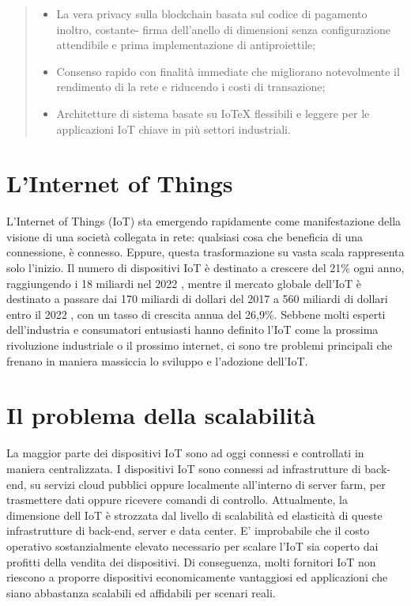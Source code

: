 \documentclass[a4paper,12pt]{article}
\begin{document}
\begin{abstract}
\begin{itemize}
		\item{La vera privacy sulla blockchain basata sul codice di pagamento inoltro, costante- firma dell'anello di dimensioni senza configurazione attendibile e prima implementazione di antiproiettile;}

		\item{Consenso rapido con finalità immediate che migliorano notevolmente il rendimento di la rete e riducendo i costi di transazione;}

		\item{Architetture di sistema basate su IoTeX flessibili e leggere per le applicazioni IoT chiave in più settori industriali.}

	\end{itemize}

\end{abstract}

\pagebreak

\tableofcontents


\section{L'Internet of Things}
L'Internet of Things (IoT) sta emergendo rapidamente come manifestazione della visione di una società collegata in rete: qualsiasi cosa che beneficia di una connessione, è connesso. Eppure, questa trasformazione su vasta scala rappresenta solo l'inizio. Il numero di dispositivi IoT è destinato a crescere del 21\% ogni anno, raggiungendo i 18 miliardi nel 2022 \cite{r10}, mentre il mercato globale dell'IoT è destinato a passare dai 170 miliardi di dollari del 2017 a 560 miliardi di dollari entro il 2022 \cite{r15}, con un tasso di crescita annua del 26,9\%. Sebbene molti esperti dell'industria e consumatori entusiasti hanno definito l'IoT come la prossima rivoluzione industriale o il prossimo internet, ci sono tre problemi principali che frenano in maniera massiccia lo sviluppo e l'adozione dell'IoT.

\section{Il problema della scalabilità}
La maggior parte dei dispositivi IoT sono ad oggi connessi e controllati in maniera centralizzata. I dispositivi IoT sono connessi ad infrastrutture di back-end, su servizi cloud pubblici oppure localmente all'interno di server farm, per trasmettere dati oppure ricevere comandi di controllo.
Attualmente, la dimensione dell IoT è strozzata dal livello di scalabilità ed elasticità di queste infrastrutture di back-end, server e data center. E' improbabile che il costo operativo sostanzialmente elevato necessario per scalare l'IoT sia coperto dai profitti della vendita dei dispositivi. Di conseguenza, molti fornitori IoT non riescono a proporre dispositivi economicamente vantaggiosi ed applicazioni che siano abbastanza scalabili ed affidabili per scenari reali.

\pagebreak




\end{document}
